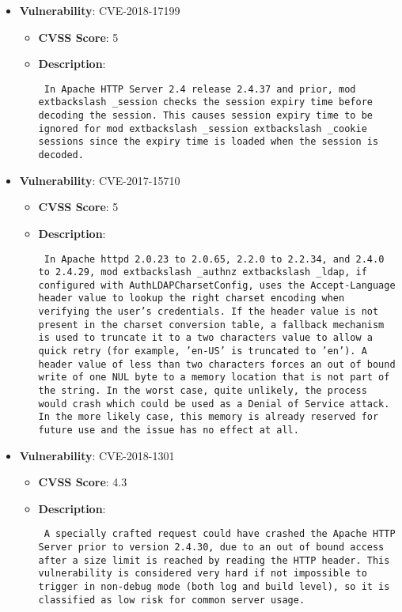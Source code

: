 \documentclass{article}
\begin{document}
\begin{itemize}
        \item \textbf{Vulnerability}: CVE-2018-17199
        \begin{itemize}
            \item \textbf{CVSS Score}:  5 
            \item \textbf{Description}: \parbox{\linewidth}{\texttt{ In Apache HTTP Server 2.4 release 2.4.37 and prior, mod	extbackslash _session checks the session expiry time before decoding the session. This causes session expiry time to be ignored for mod	extbackslash _session	extbackslash _cookie sessions since the expiry time is loaded when the session is decoded. }}
        \end{itemize}
    
        \item \textbf{Vulnerability}: CVE-2017-15710
        \begin{itemize}
            \item \textbf{CVSS Score}:  5 
            \item \textbf{Description}: \parbox{\linewidth}{\texttt{ In Apache httpd 2.0.23 to 2.0.65, 2.2.0 to 2.2.34, and 2.4.0 to 2.4.29, mod	extbackslash _authnz	extbackslash _ldap, if configured with AuthLDAPCharsetConfig, uses the Accept-Language header value to lookup the right charset encoding when verifying the user's credentials. If the header value is not present in the charset conversion table, a fallback mechanism is used to truncate it to a two characters value to allow a quick retry (for example, 'en-US' is truncated to 'en'). A header value of less than two characters forces an out of bound write of one NUL byte to a memory location that is not part of the string. In the worst case, quite unlikely, the process would crash which could be used as a Denial of Service attack. In the more likely case, this memory is already reserved for future use and the issue has no effect at all. }}
        \end{itemize}
    
        \item \textbf{Vulnerability}: CVE-2018-1301
        \begin{itemize}
            \item \textbf{CVSS Score}:  4.3 
            \item \textbf{Description}: \parbox{\linewidth}{\texttt{ A specially crafted request could have crashed the Apache HTTP Server prior to version 2.4.30, due to an out of bound access after a size limit is reached by reading the HTTP header. This vulnerability is considered very hard if not impossible to trigger in non-debug mode (both log and build level), so it is classified as low risk for common server usage. }}
        \end{itemize}
    

\end{itemize}
\end{document}
